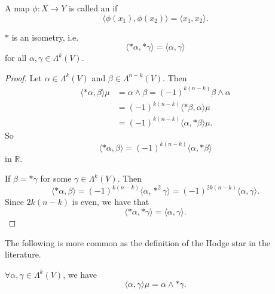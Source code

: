 \documentclass[notoc,notitlepage]{tufte-book}
\begin{document}
\begin{defn}[Isometry]\label{defn:isometry}
  A map $\phi : X \to Y$ is called an  if
  \begin{equation*}
    \langle \phi(x_1), \phi(x_2) \rangle = \langle x_1, x_2 \rangle.
  \end{equation*}
\end{defn}

\begin{propo}[$*$ is an isometry]\label{propo:star_is_an_isometry}
  $*$ is an isometry, i.e.
  \begin{equation*}
    \langle *\alpha, * \gamma \rangle = \langle \alpha, \gamma \rangle
  \end{equation*}
  for all $\alpha, \gamma \in \Lambda^k(V)$.
\end{propo}

\begin{proof}
  Let $\alpha \in \Lambda^k(V)$ and $\beta \in \Lambda^{n-k}(V)$. Then
  \begin{align*}
    \langle *\alpha, \beta \rangle \mu
    &= \alpha \land \beta = (-1)^{k(n-k)} \beta \land \alpha \\
    &= (-1)^{k(n-k)} \langle *\beta, \alpha \rangle \mu \\
    &= (-1)^{k(n-k)} \langle \alpha, *\beta \rangle \mu.
  \end{align*}
  So
  \begin{equation*}
    \langle *\alpha, \beta \rangle = (-1)^{k(n-k)} \langle \alpha, *\beta \rangle
  \end{equation*}
  in $\mathbb{R}$.

  If $\beta = *\gamma$ for some $\gamma \in \Lambda^k(V)$. Then
  \begin{equation*}
    \langle *\alpha, \beta \rangle = (-1)^{k(n-k)} \langle \alpha, *^2 \gamma
    \rangle = (-1)^{2k(n-k)} \langle \alpha, \gamma \rangle.
  \end{equation*}
  Since $2k(n-k)$ is even, we have that
  \begin{equation*}
    \langle *\alpha, *\gamma \rangle = \langle \alpha, \gamma \rangle.
  \end{equation*}
\end{proof}

The following is more common as the definition of the Hodge star in the
literature.

\begin{crly}\label{crly:alternative_definition_of_the_hodge_star_operator}
  $\forall \alpha, \gamma \in \Lambda^k(V)$, we have
  \begin{equation*}
    \langle \alpha, \gamma \rangle \mu = \alpha \land * \gamma.
  \end{equation*}
\end{crly}
\end{document}
